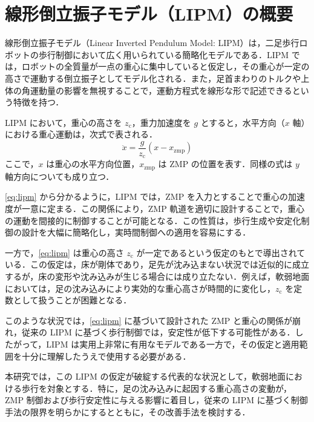 \section{線形倒立振子モデル（LIPM）の概要}
\label{sec:lipm_overview}

線形倒立振子モデル（Linear Inverted Pendulum Model: LIPM）は，二足歩行ロボットの歩行制御において広く用いられている簡略化モデルである．LIPM では，ロボットの全質量が一点の重心に集中していると仮定し，その重心が一定の高さで運動する倒立振子としてモデル化される．また，足首まわりのトルクや上体の角運動量の影響を無視することで，運動方程式を線形な形で記述できるという特徴を持つ．

LIPM において，重心の高さを $z_{\mathrm{c}}$，重力加速度を $g$ とすると，水平方向（$x$ 軸）における重心運動は，次式で表される．
\begin{equation}
\ddot{x} = \frac{g}{z_{\mathrm{c}}} (x - x_{\mathrm{zmp}})
\label{eq:lipm}
\end{equation}
ここで，$x$ は重心の水平方向位置，$x_{\mathrm{zmp}}$ は ZMP の位置を表す．同様の式は $y$ 軸方向についても成り立つ．

\cref{eq:lipm} から分かるように，LIPM では，ZMP を入力とすることで重心の加速度が一意に定まる．この関係により，ZMP 軌道を適切に設計することで，重心の運動を間接的に制御することが可能となる．この性質は，歩行生成や安定化制御の設計を大幅に簡略化し，実時間制御への適用を容易にする．

一方で，\cref{eq:lipm} は重心の高さ $z_{\mathrm{c}}$ が一定であるという仮定のもとで導出されている．この仮定は，床が剛体であり，足先が沈み込まない状況では近似的に成立するが，床の変形や沈み込みが生じる場合には成り立たない．例えば，軟弱地面においては，足の沈み込みにより実効的な重心高さが時間的に変化し，$z_{\mathrm{c}}$ を定数として扱うことが困難となる．

このような状況では，\cref{eq:lipm} に基づいて設計された ZMP と重心の関係が崩れ，従来の LIPM に基づく歩行制御では，安定性が低下する可能性がある．したがって，LIPM は実用上非常に有用なモデルである一方で，その仮定と適用範囲を十分に理解したうえで使用する必要がある．

本研究では，この LIPM の仮定が破綻する代表的な状況として，軟弱地面における歩行を対象とする．特に，足の沈み込みに起因する重心高さの変動が，ZMP 制御および歩行安定性に与える影響に着目し，従来の LIPM に基づく制御手法の限界を明らかにするとともに，その改善手法を検討する．
